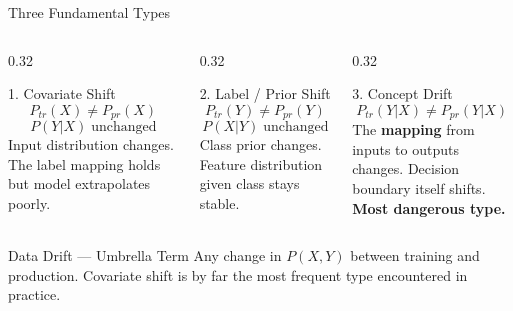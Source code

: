 \documentclass[10pt,aspectratio=169]{beamer}
\begin{document}
\begin{frame}{Three Fundamental Types}
  \begin{columns}[T]
    \begin{column}{0.32\textwidth}
      \begin{block}{1. Covariate Shift}
        \[ P_{tr}(X) \neq P_{pr}(X) \]
        \[ P(Y|X)\;\text{unchanged} \]
        \vspace{2pt}
        Input distribution changes. The label mapping holds but model extrapolates poorly.
      \end{block}
    \end{column}
    \begin{column}{0.32\textwidth}
      \begin{block}{2. Label / Prior Shift}
        \[ P_{tr}(Y) \neq P_{pr}(Y) \]
        \[ P(X|Y)\;\text{unchanged} \]
        \vspace{2pt}
        Class prior changes. Feature distribution given class stays stable.
      \end{block}
    \end{column}
    \begin{column}{0.32\textwidth}
      \begin{alertblock}{3. Concept Drift}
        \[ P_{tr}(Y|X) \neq P_{pr}(Y|X) \]
        \vspace{2pt}
        The \textbf{mapping} from inputs to outputs changes. Decision boundary itself shifts.\\[4pt]
        \textbf{Most dangerous type.}
      \end{alertblock}
    \end{column}
  \end{columns}
  \vspace{0.3cm}
  \begin{block}{Data Drift --- Umbrella Term}
    Any change in $P(X,Y)$ between training and production. Covariate shift is by far the most frequent type encountered in practice.
  \end{block}
\end{frame}
\end{document}
